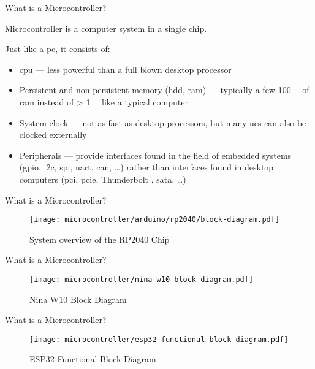 \begin{frame}{What is a Microcontroller?}
    \par Microcontroller is a computer system in a single chip.
    \par Just like a \acs{pc}, it consists of:
    \begin{itemize}
        \item \acs{cpu} --- less powerful than a full blown desktop processor
        \item Persistent and non-persistent memory (\acs{hdd}, \acs{ram}) --- typically a few \SI{100}{\kibi\byte} of \acs{ram} instead of > \SI{1}{\gibi\byte} like a typical computer
        \item System clock --- not as fast as desktop processors, but many \acsp{uc} can also be clocked externally
        \item Peripherals --- provide interfaces found in the field of embedded systems (\acs{gpio}, \acs{i2c}, \acs{spi}, \acs{uart}, \acs{can}, \ldots) rather than interfaces found in desktop computers (\acs{pci}, \acs{pcie}, Thunderbolt \texttrademark, \acs{sata}, \ldots)
    \end{itemize}
\end{frame}

\begin{frame}{What is a Microcontroller?}
    \begin{figure}
        \texttt{[image: microcontroller/arduino/rp2040/block-diagram.pdf]}
        \caption{System overview of the RP2040 Chip}
    \end{figure}
\end{frame}

\begin{frame}{What is a Microcontroller?}
    \begin{figure}
        \texttt{[image: microcontroller/nina-w10-block-diagram.pdf]}
        \caption{Nina W10 Block Diagram}
    \end{figure}
\end{frame}

\begin{frame}{What is a Microcontroller?}
    \begin{figure}
        \texttt{[image: microcontroller/esp32-functional-block-diagram.pdf]}
        \caption{ESP32 Functional Block Diagram}
    \end{figure}
\end{frame}